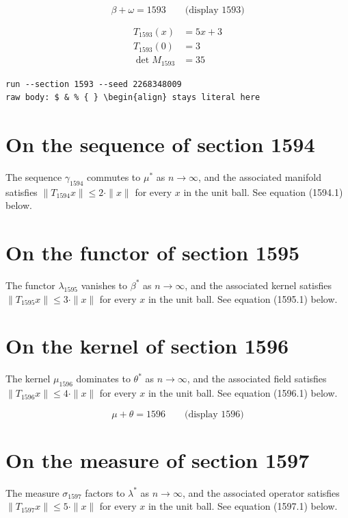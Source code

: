\documentclass{article}
\begin{document}
$$
\beta + \omega = 1593 \qquad \text{(display 1593)}
$$

\begin{align}
T_{1593}(x) &= 5 x + 3 \\
T_{1593}(0) &= 3 \\
\det M_{1593} &= 35
\end{align}

\begin{verbatim}
run --section 1593 --seed 2268348009
raw body: $ & % { } \begin{align} stays literal here
\end{verbatim}

\section{On the sequence of section 1594}
The sequence $\gamma_{1594}$ commutes to $\mu^{*}$ as $n \to \infty$,
and the associated manifold satisfies $\|T_{1594} x\| \leq 2 \cdot \|x\|$
for every $x$ in the unit ball. See equation (1594.1) below.

\section{On the functor of section 1595}
The functor $\lambda_{1595}$ vanishes to $\beta^{*}$ as $n \to \infty$,
and the associated kernel satisfies $\|T_{1595} x\| \leq 3 \cdot \|x\|$
for every $x$ in the unit ball. See equation (1595.1) below.

\section{On the kernel of section 1596}
The kernel $\mu_{1596}$ dominates to $\theta^{*}$ as $n \to \infty$,
and the associated field satisfies $\|T_{1596} x\| \leq 4 \cdot \|x\|$
for every $x$ in the unit ball. See equation (1596.1) below.

$$
\mu + \theta = 1596 \qquad \text{(display 1596)}
$$

\section{On the measure of section 1597}
The measure $\sigma_{1597}$ factors to $\lambda^{*}$ as $n \to \infty$,
and the associated operator satisfies $\|T_{1597} x\| \leq 5 \cdot \|x\|$
for every $x$ in the unit ball. See equation (1597.1) below.
\end{document}
